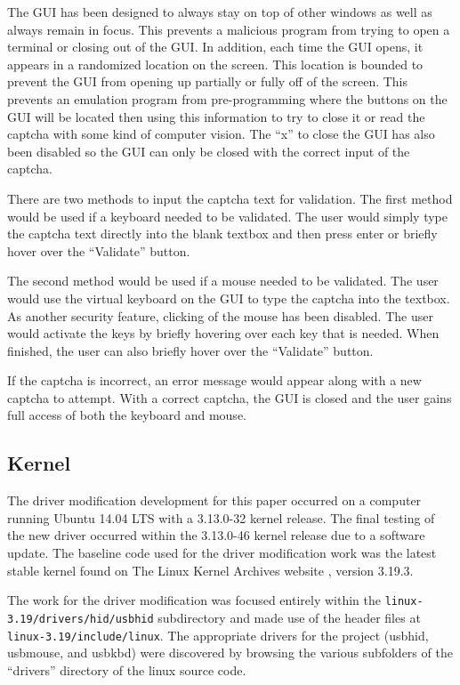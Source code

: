 \documentclass[pagenumbers]{ieee}
\begin{document}
The GUI has been designed to always stay on top of other windows as well as always remain in focus. This prevents a malicious program from trying to open a terminal or closing out of the GUI. In addition, each time the GUI opens, it appears in a randomized location on the screen. This location is bounded to prevent the GUI from opening up partially or fully off of the screen. This prevents an emulation program from pre-programming where the buttons on the GUI will be located then using this information to try to close it or read the captcha with some kind of computer vision. The ``x'' to close the GUI has also been disabled so the GUI can only be closed with the correct input of the captcha.

There are two methods to input the captcha text for validation. The first method would be used if a keyboard needed to be validated. The user would simply type the captcha text directly into the blank textbox and then press enter or briefly hover over the ``Validate'' button.

The second method would be used if a mouse needed to be validated. The user would use the virtual keyboard on the GUI to type the captcha into the textbox. As another security feature, clicking of the mouse has been disabled. The user would activate the keys by briefly hovering \cite{hover} over each key that is needed. When finished, the user can also briefly hover over the ``Validate'' button.

If the captcha is incorrect, an error message would appear along with a new captcha to attempt. With a correct captcha, the GUI is closed and the user gains full access of both the keyboard and mouse.


\subsection{Kernel}

The driver modification development for this paper occurred on a computer running Ubuntu 14.04 LTS with a 3.13.0-32 kernel release. The final testing of the new driver occurred within the 3.13.0-46 kernel release due to a software update. The baseline code used for the driver modification work was the latest stable kernel found on The Linux Kernel Archives website %
, version 3.19.3. 

The work for the driver modification was focused entirely within the \texttt{linux-3.19/drivers/hid/usbhid} subdirectory and made use of the header files at \texttt{linux-3.19/include/linux}. The appropriate drivers for the project (usbhid, usbmouse, and usbkbd) were discovered by browsing the various subfolders of the ``drivers'' directory of the linux source code.
\end{document}
